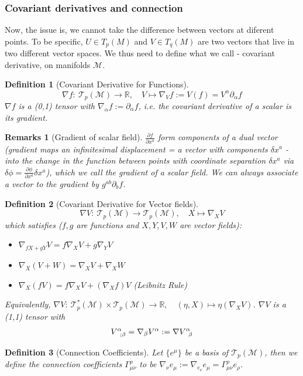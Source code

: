 \documentclass[a4paper]{article}
\newtheorem{remarks}{Remarks}[section]
\theoremstyle{new}
\newtheorem{defi}{Definition}[section]
\begin{document}
\subsubsection{Covariant derivatives and connection}
Now, the issue is, we cannot take the difference between vectors at diferent points. To be specific, $U\in T_p(M)$ and $V\in T_q(M)$ are two vectors that live in two different vector spaces. We thus need to define what we call - covariant derivative, on manifolds $\mathcal{M}$.
\begin{defi}[Covariant Derivative for Functions]
\begin{equation}
\nabla  f:~\mathcal{T}_p(\mathcal{M})\rightarrow\mathbb{R},\quad V\mapsto\nabla_Vf:=V(f)=V^\alpha\partial_\alpha f\label{covderivfunc}
\end{equation}
$\nabla f$ is a (0,1) tensor with $\nabla_\alpha f:=\partial_\alpha f$, i.e. the covariant derivative of a scalar is its gradient.
\end{defi}
\begin{remarks}[Gradient of scalar field]
$\frac{\partial f}{\partial x^a}$ form components of a dual vector (gradient maps an infinitesimal displacement = a vector with components $\delta x^a$ - into the change in the function between points with coordinate separation $\delta x^a$ via $\delta\phi=\frac{\partial\phi}{\partial x^a}\delta x^a$), which we call the gradient of a scalar field. We can always associate a vector to the gradient by $g^{ab}\partial_bf$. 
\end{remarks}
\begin{defi}[Covariant Derivative for Vector fields]
$$\nabla  V:~\mathcal{T}_p(\mathcal{M})\rightarrow\mathcal{T}_p(\mathcal{M}),\quad X\mapsto\nabla_XV$$
which satisfies ($f,g$ are functions and $X,Y,V,W$ are vector fields):
\begin{itemize}
    \item $\nabla_{fX+gY}V=f\nabla_XV+g\nabla_YV$
    \item $\nabla_X(V+W)=\nabla_XV+\nabla_XW$
    \item $\nabla_X(fV)=f\nabla_XV+(\nabla_Xf)V$ (Leibnitz Rule)
\end{itemize}
Equivalently, $\nabla V:~\mathcal{T}_p^*(\mathcal{M})\times \mathcal{T}_p(\mathcal{M})\rightarrow\mathbb{R},\quad (\eta,X)\mapsto\eta(\nabla_XV)$. $\nabla V$ is a (1,1) tensor with $$\tensor*{V}{*_{}^{\alpha}_{;\beta}}=\nabla_\beta V^\alpha:=\tensor*{\nabla V}{*_{}^{\alpha}_{\beta}}$$ 
\end{defi}
\begin{defi}[Connection Coefficients]
Let $\{e^\mu\}$ be a basis of $\mathcal{T}_p(\mathcal{M})$, then we define the connection coefficients $\Gamma^\rho_{\mu\nu}$ to be $\nabla_\nu e_\mu:=\nabla_{e_\nu}e_\mu=\Gamma_{\mu\nu}^\rho e_\rho$.
\end{defi}
\end{document}
